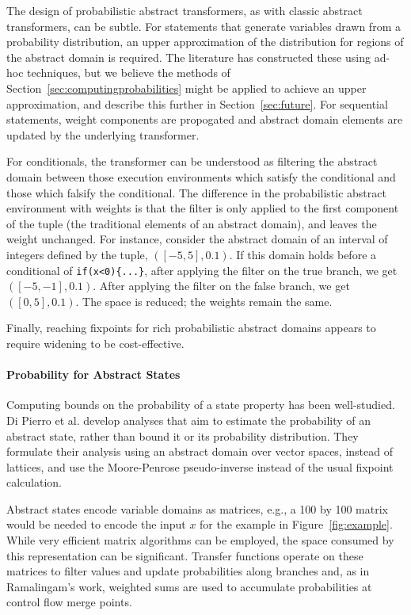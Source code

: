 The design of probabilistic abstract transformers, as with 
classic abstract transformers, can be subtle.
For statements that generate variables drawn from a probability
distribution, an upper approximation of the distribution for
regions of the abstract domain is required.  The literature
has constructed these using ad-hoc techniques, but we believe
the methods of Section~\ref{sec:computingprobabilities} might be applied to 
achieve an upper approximation, and describe this further in Section~\ref{sec:future}.
For sequential statements, weight components are propogated
and abstract domain elements are updated by the underlying transformer.

For conditionals, the transformer can be understood
as filtering the abstract domain between those execution environments which
satisfy the conditional and those which falsify the conditional. 
The difference in the probabilistic abstract environment with weights 
is that the filter is only applied to the first component of
the tuple (the traditional elements of an abstract domain), 
and leaves the weight unchanged.
For instance, consider the abstract domain of an interval of 
integers defined by the tuple, $([-5,5],0.1)$. 
If this domain holds before a conditional of 
{\tt if(x<0)\{...\}}, after applying the filter on the true branch, 
we get $([-5,-1],0.1)$. 
After applying the filter on the false branch, we get $([0,5],0.1)$.
The space is reduced; the weights remain the same.

Finally, reaching fixpoints for rich probabilistic abstract domains
appears to require widening \cite{monniaux2000abstract,esparza2011probabilistic} to be cost-effective.

\paragraph{Probability for Abstract States}

Computing bounds on the probability of a state property has been well-studied.
Di Pierro et al. \cite{di2013probabilistic} develop analyses
that aim to estimate the probability of an abstract state, 
rather than bound it or its probability distribution.  
They formulate their analysis using an abstract 
domain over vector spaces, instead of lattices, and use
the Moore-Penrose pseudo-inverse instead of the usual fixpoint calculation.

Abstract states encode variable domains as matrices, e.g., a 100 by 100 matrix
would be needed to encode the input $x$ for the example in 
Figure~\ref{fig:example}.  While very efficient matrix algorithms
can be employed, the space consumed by this representation can
be significant.  
Transfer functions operate on these matrices to filter values and
update probabilities along branches and, 
as in Ramalingam's work, weighted sums are used to accumulate probabilities
at control flow merge points.

